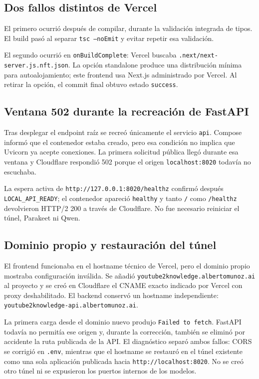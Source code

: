 \documentclass[11pt,a4paper]{article}
\begin{document}
\subsection{Dos fallos distintos de Vercel}
El primero ocurrió después de compilar, durante la validación integrada de tipos.
El build pasó al separar \texttt{tsc --noEmit} y evitar repetir esa validación.

El segundo ocurrió en \texttt{onBuildComplete}: Vercel buscaba
\texttt{.next/next-server.js.nft.json}. La opción standalone produce una
distribución mínima para autoalojamiento; este frontend usa Next.js administrado
por Vercel. Al retirar la opción, el commit final obtuvo estado
\texttt{success}.

\subsection{Ventana 502 durante la recreación de FastAPI}
Tras desplegar el endpoint raíz se recreó únicamente el servicio \texttt{api}.
Compose informó que el contenedor estaba creado, pero esa condición no implica
que Uvicorn ya acepte conexiones. La primera solicitud pública llegó durante esa
ventana y Cloudflare respondió 502 porque el origen \texttt{localhost:8020}
todavía no escuchaba.

La espera activa de \texttt{http://127.0.0.1:8020/healthz} confirmó después
\texttt{LOCAL\_API\_READY}; el contenedor apareció \texttt{healthy} y tanto
\texttt{/} como \texttt{/healthz} devolvieron HTTP/2 200 a través de Cloudflare.
No fue necesario reiniciar el túnel, Parakeet ni Qwen.

\subsection{Dominio propio y restauración del túnel}
El frontend funcionaba en el hostname técnico de Vercel, pero el dominio propio
mostraba configuración inválida. Se añadió
\texttt{youtube2knowledge.albertomunoz.ai} al proyecto y se creó en Cloudflare
el CNAME exacto indicado por Vercel con proxy deshabilitado. El backend conservó
un hostname independiente: \texttt{youtube2knowledge-api.albertomunoz.ai}.

La primera carga desde el dominio nuevo produjo \texttt{Failed to fetch}. FastAPI
todavía no permitía ese origen y, durante la corrección, también se eliminó por
accidente la ruta publicada de la API. El diagnóstico separó ambos fallos: CORS
se corrigió en \texttt{.env}, mientras que el hostname se restauró en el túnel
existente como una sola aplicación publicada hacia
\texttt{http://localhost:8020}. No se creó otro túnel ni se expusieron los
puertos internos de los modelos.
\end{document}
